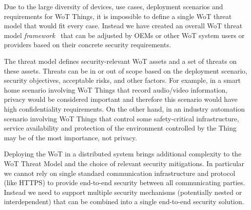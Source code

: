 
Due to the large diversity of devices,
use cases,
deployment scenarios 
and requirements for WoT Things,
it is impossible to define a single WoT threat model
that would fit every case.
Instead we have created an overall WoT threat model
\emph{framework}~\cite{Wot2017sec} 
that can be adjusted by OEMs or other WoT system users or providers
based on their concrete security requirements.


The threat model defines security-relevant WoT assets 
and a set of threats on these assets.
Threats can be in or out of scope based on the deployment scenario,
security objectives, acceptable risks, and other factors.
For example,
in a smart home scenario involving WoT Things that record audio/video
information, privacy would be considered important and 
therefore this scenario would have high confidentiality requirements.
On the other hand,
in an industry automation scenario involving WoT Things that 
control some safety-critical infrastructure,
service availability and protection of the environment controlled by the Thing 
may be of the most importance, not privacy.

Deploying the WoT in a distributed system brings additional complexity 
to the WoT Threat Model and the choice of relevant security mitigations.
In particular we cannot rely on single standard communication infrastructure 
and protocol 
(like HTTPS) to provide end-to-end security between all communicating
parties.
Instead we need to support multiple security mechanisms 
(potentially nested or interdependent) 
that can be combined into a single end-to-end security solution.  
 
